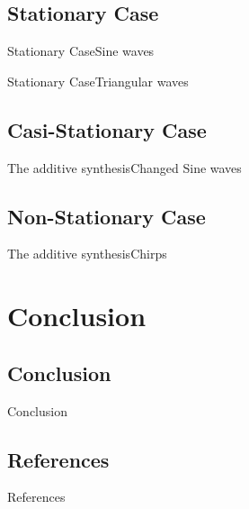 \documentclass{bredelebeamer}
\begin{document}
\subsection{Stationary Case}
\begin{frame}{Stationary Case}{Sine waves}

\end{frame}
\begin{frame}{Stationary Case}{Triangular waves}

\end{frame}
\subsection{Casi-Stationary Case}
\begin{frame}{The additive synthesis}{Changed Sine waves}

\end{frame}
\subsection{Non-Stationary Case}
\begin{frame}{The additive synthesis}{Chirps}
\end{frame}

\section{Conclusion}
\subsection{Conclusion}
\begin{frame}{Conclusion}{}

\end{frame}
\subsection{References}
\begin{frame}{References}{}

\end{frame}
\end{document}
